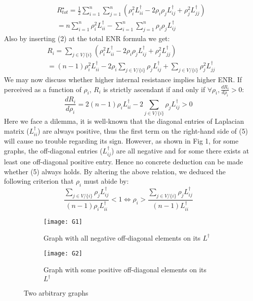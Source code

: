 \documentclass{article}
\begin{document}
	\begin{equation}
		\begin{aligned}
			&R_{tot}^{\star}=\frac{1}{2}\sum_{i=1}^{n}\sum_{j=1}^{n} \left(\rho_i^{2} L_{ii}^{\dag} - 2\rho_i \rho_j L_{ij}^{\dag} + \rho_j^{2} L_{jj}^{\dag} \right) \\
			&= n\sum_{i=1}^{n} \rho_i^{2}L_{ii}^{\dag} - \sum_{i=1}^{n}\sum_{j=1}^{n} \rho_i\rho_j L_{ij}^{\dag}
		\end{aligned}
	\end{equation} 
	Also by inserting (2) at the total ENR formula we get:
	\begin{equation}
	\begin{aligned}
		&R_i = \sum_{j\in V/ \{i\}} \left( \rho_i^{2} L_{ii}^{\dag} - 2\rho_i \rho_j L_{ij}^{\dag} + \rho_j^{2} L_{jj}^{\dag} \right) \\
		&=(n-1)\rho_i^{2}L_{ii}^{\dag}-2\rho_i \sum_{j\in V/ \{i\}} \rho_j L_{ij}^{\dag} + \sum_{j\in V/ \{i\}} \rho_j^{2} L_{jj}^{\dag}
	\end{aligned}
	\end{equation}
	We may now discuss whether higher internal resistance implies higher ENR. If perceived as a function of $\rho_i$, $R_i$ is strictly ascendant if and only if $\forall \rho_i, \frac{dR_i}{d\rho_i} > 0$:
	\begin{equation}
		\frac{dR_i}{d \rho_i} = 2(n-1)\rho_i L_{ii}^{\dag} - 2\sum_{j\in V / \{i\}} \rho_j L_{ij}^{\dag} > 0
	\end{equation}
	Here we face a dilemma, it is well-known that the diagonal entries of Laplacian matrix ($L_{ii}^{\dag}$) are always positive, thus the first term on the right-hand side of (5) will cause no trouble regarding its sign. However, as shown in Fig 1, for some graphs, the off-diagonal entries ($L_{ij}^{\dag}$) are all negative and for some there exists at least one off-diagonal positive entry. Hence no concrete deduction can be made whether (5) always holds. By altering the above relation, we deduced the following criterion that $\rho_i$ must abide by:
	\begin{equation}
		\frac{\sum_{j\in V / \{i\}} \rho_j L_{ij}^{\dag}} {(n-1)\rho_i L_{ii}^{\dag}} < 1 \Longleftrightarrow \rho_i > \frac{\sum_{j\in V / \{i\}} \rho_j L_{ij}^{\dag}} {(n-1) L_{ii}^{\dag}}
	\end{equation}
	\pagebreak
	\begin{figure}[t!]
		\centering
		\begin{subfigure}[t]{0.495\textwidth}
			\centering
			\texttt{[image: G1]}
			\caption{Graph with all negative off-diagonal elements on its $L^{\dag}$}
			\label{fig:3-a}
		\end{subfigure}
		\hfill
		\begin{subfigure}[t]{0.495\textwidth}
			\centering
			\texttt{[image: G2]}
			\caption{Graph with some positive off-diagonal elements on its $L^{\dag}$}
			\label{fig:3-b}
		\end{subfigure}
		\caption{Two arbitrary graphs}
		\label{fig:3}
	\end{figure}
	
\end{document}
